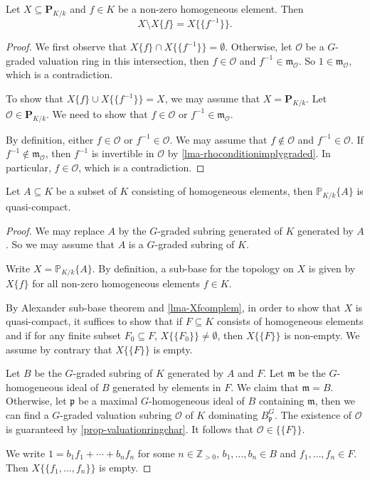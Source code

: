 \begin{lemma}\label{lma-Xfcomplem}
    Let $X\subseteq \mathbf{P}_{K/k}$ and $f\in K$ be a non-zero homogeneous element. Then
    \[
        X\setminus X\{f\}=  X\{\{f^{-1}\}\}.
    \]
\end{lemma}
\begin{proof}
    We first observe that $X\{f\}\cap X\{\{f^{-1}\}\}=\emptyset$. Otherwise, let $\mathcal{O}$ be a $G$-graded valuation ring in this intersection, then $f\in \mathcal{O}$ and $f^{-1}\in \mathfrak{m}_{\mathcal{O}}$. So $1\in \mathfrak{m}_{\mathcal{O}}$, which is a contradiction.

    To show that $X\{f\}\cup  X\{\{f^{-1}\}\}=X$, we may assume that $X=\mathbf{P}_{K/k}$. Let $\mathcal{O}\in \mathbf{P}_{K/k}$. We need to show that $f\in \mathcal{O}$ or $f^{-1}\in \mathfrak{m}_{\mathcal{O}}$.
    
    By definition, either $f\in \mathcal{O}$ or $f^{-1}\in \mathcal{O}$. We may assume that $f\not\in \mathcal{O}$ and $f^{-1}\in \mathcal{O}$. If $f^{-1}\not\in \mathfrak{m}_{\mathcal{O}}$, then $f^{-1}$ is invertible in $\mathcal{O}$ by \cref{lma-rhoconditionimplygraded}. In particular, $f\in \mathcal{O}$, which is a contradiction.
\end{proof}



\begin{lemma}
    Let $A\subseteq K$ be a subset of $K$ consisting of homogeneous elements, then $\mathbb{P}_{K/k}\{A\}$ is quasi-compact.
\end{lemma}
\begin{proof}
    We may replace $A$ by the $G$-graded subring generated of $K$ generated by $A$. So we may assume that $A$ is a $G$-graded subring of $K$. 
    
    Write $X=\mathbb{P}_{K/k}\{A\}$. By definition, a sub-base for the topology on $X$ is given by $X\{f\}$ for all non-zero homogeneous elements $f\in K$. 

    By Alexander sub-base theorem and \cref{lma-Xfcomplem}, in order to show that $X$ is quasi-compact, it suffices to show that if $F\subseteq K$ consists of homogeneous elements and if for any finite subset $F_0\subseteq F$, $X\{\{F_0\}\}\neq \emptyset$, then $X\{\{F\}\}$ is non-empty. We assume by contrary that $X\{\{F\}\}$ is empty.

    Let $B$ be the $G$-graded subring of $K$ generated by $A$ and $F$. Let $\mathfrak{m}$ be the $G$-homogeneous ideal of $B$ generated by elements in $F$. We claim that $\mathfrak{m}=B$. Otherwise, let $\mathfrak{p}$ be a maximal $G$-homogeneous ideal of $B$ containing $\mathfrak{m}$, then we can find a $G$-graded valuation subring $\mathcal{O}$ of $K$ dominating $B_{\mathfrak{p}}^G$. The existence of $\mathcal{O}$ is guaranteed by \cref{prop-valuationringchar}. It follows that $\mathcal{O}\in \{\{F\}\}$.

    We write $1=b_1 f_1+\cdots+b_nf_n$ for some $n\in \mathbb{Z}_{>0}$, $b_1,\ldots,b_n\in B$ and $f_1,\ldots,f_n\in F$. Then $X\{\{f_1,\ldots,f_n\}\}$ is empty.
\end{proof}


